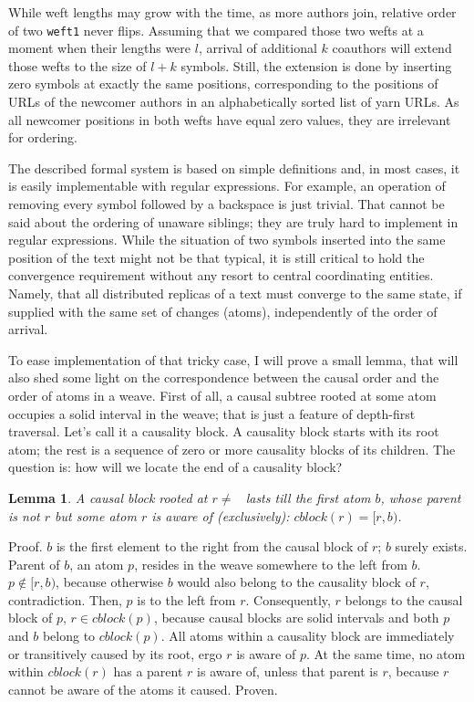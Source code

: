 \documentclass{acm_proc_article-sp}
\newtheorem{lemma}{Lemma}
\begin{document}
While weft lengths may grow with the time, as more authors
join, relative order of two {\tt weft1} never flips.
Assuming that we compared those two wefts at a moment when
their lengths were $l$, arrival of additional $k$ coauthors
will extend those wefts to the size of $l+k$ symbols. Still,
the extension is done by inserting zero symbols at exactly
the same positions, corresponding to the positions of URLs
of the newcomer authors in an alphabetically sorted list
of yarn URLs. As all newcomer positions in both wefts have
equal zero values, they are irrelevant for ordering.

The described formal system is based on simple definitions
and, in most cases, it is easily implementable with regular
expressions. For example, an operation of removing every
symbol followed by a backspace is just trivial. That cannot
be said about the ordering of unaware siblings; they are
truly hard to implement in regular expressions. While the
situation of two symbols inserted into the same position
of the text might not be that typical, it is still critical
to hold the convergence requirement without any resort to
central coordinating entities. Namely, that all distributed
replicas of a text must converge to the same state, if
supplied with the same set of changes (atoms), independently
of the order of arrival.

To ease implementation of that tricky case, I will prove
a small lemma, that will also shed some light on the
correspondence between the causal order and the order of atoms
in a weave.
First of all, a causal subtree rooted at some atom occupies
a solid interval in the weave; that is just a feature of
depth-first traversal. Let's call it a causality block.
A causality block starts with its root atom; the rest is
a sequence of zero or more causality blocks of its children.
The question is: how will we locate the end of a causality
block?
\begin{lemma} A causal block rooted at $r \ne$ \aum ~lasts till
the first atom $b$, whose parent is not $r$ but some atom
$r$ is aware of (exclusively):  $cblock(r) = [r,b)$. 
\end{lemma}
Proof. $b$ is the first element to the right from the causal
block of $r$; $b$ surely exists. Parent of $b$, an atom $p$,
resides in the weave somewhere to the left from $b$.
$p \notin [r,b)$, because otherwise $b$ would also belong
to the causality block of $r$, contradiction.
Then, $p$ is to the left from $r$. Consequently, $r$ belongs
to the causal block of $p$, $r \in cblock(p)$, because
causal blocks are solid intervals and both $p$ and $b$
belong to $cblock(p)$. All atoms within a causality block are
immediately or transitively caused by its root,
ergo $r$ is aware of $p$. At the same time, no atom
within $cblock(r)$ has a parent $r$ is aware of, unless
that parent is $r$, because $r$ cannot be aware of the
atoms it caused. Proven.
\end{document}
